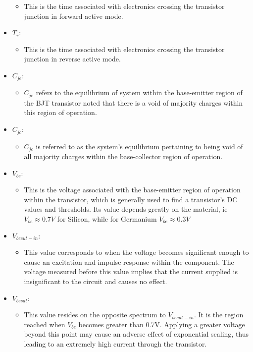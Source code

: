 \documentclass[12pt]{article}
\begin{document}
\begin{itemize}
\begin{itemize}
\item This is the time associated with electronics crossing the transistor junction in forward active mode.
\end{itemize}
\item $T_r$:
\begin{itemize}
\item This is the time associated with electronics crossing the transistor junction in reverse active mode.
\end{itemize}
\item $C_{je}$:
\begin{itemize}
\item $C_{je}$ refers to the equilibrium of system within the base-emitter region of the BJT transistor noted that there is a void of majority charges within this region of operation.
\end{itemize}
\item $C_{jc}$:
\begin{itemize}
\item $C_{jc}$ is referred to as the system's equilibrium pertaining to being void of all majority charges within the base-collector region of operation.
\end{itemize}
\item $V_{be}$:
\begin{itemize}
\item This is the voltage associated with the base-emitter region of operation within the transistor, which is generally used to find a transistor's DC values and thresholds. Its value depends greatly on the material, ie $V_{be}\approx0.7V$ for Silicon, while for Germanium $V_{be}\approx0.3V$
\end{itemize}
\item $V_{be cut-in}$:
\begin{itemize}
\item This value corresponds to when the voltage becomes significant enough to cause an excitation and impulse response within the component. The voltage measured before this value implies that the current supplied is insignificant to the circuit and causes no effect.
\end{itemize}
\item $V_{be sat}$:
\begin{itemize}
\item This value resides on the opposite spectrum to $V_{be cut-in}$. It is the region reached when $V_{be}$ becomes greater than 0.7V. Applying a greater voltage beyond this point may cause an adverse effect of exponential scaling, thus leading to an extremely high current through the transistor.

\end{itemize}
\end{itemize}
\end{document}

